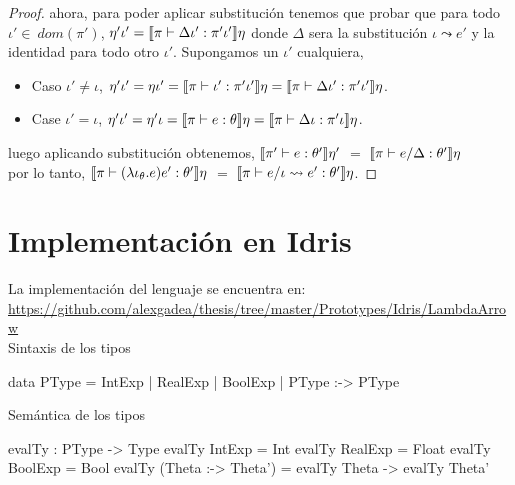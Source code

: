 \begin{proof}
ahora, para poder aplicar substituci\'on tenemos que probar que
para todo $\iota' \in \ dom (\pi')$, $\eta' \iota' = \llbracket \pi \vdash \Delta\iota' : \pi' \iota' \rrbracket\eta$
donde $\Delta$ sera la substituci\'on $\iota \leadsto e'$ y la identidad para todo otro $\iota'$. Supongamos un $\iota'$ cualquiera,

\begin{itemize}
\item Caso $\iota' \neq \iota$, $\eta' \iota' = \eta \iota' = 
									\llbracket \pi \vdash \iota' : \pi'\iota' \rrbracket\eta = 
									\llbracket \pi \vdash \Delta \iota' : \pi'\iota' \rrbracket\eta$.

\item Case $\iota' = \iota$, $\eta' \iota' = \eta' \iota = 
									 \llbracket \pi \vdash e : \theta \rrbracket\eta = 
									 \llbracket \pi \vdash \Delta \iota : \pi'\iota \rrbracket\eta$.
\end{itemize}

luego aplicando substituci\'on obtenemos,
$\llbracket \pi' \vdash e : \theta' \rrbracket\eta'$ $=$ $\llbracket \pi \vdash e / \Delta : \theta' \rrbracket\eta$\\

por lo tanto, $\llbracket \pi \vdash (\lambda \iota_{\theta} . e)e' : \theta' \rrbracket\eta$ $=$
 			  $\llbracket \pi \vdash e / \iota \leadsto e' : \theta' \rrbracket\eta$.

\end{proof}

\section{Implementaci\'on en Idris}

La implementaci\'on del lenguaje se encuentra en:\\
\url{https://github.com/alexgadea/thesis/tree/master/Prototypes/Idris/LambdaArrow}\\

\noindent
Sintaxis de los tipos
\begin{code}
data PType = IntExp | RealExp | BoolExp 
          | PType :-> PType
\end{code}

\noindent
Sem\'antica de los tipos
\begin{code}
evalTy : PType -> Type
evalTy IntExp    = Int
evalTy RealExp   = Float
evalTy BoolExp   = Bool
evalTy (Theta :-> Theta') = evalTy Theta -> evalTy Theta'
\end{code}

\noindent

